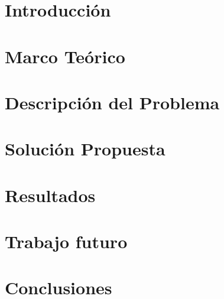 \documentclass[letterpaper,12pt]{book}
\begin{document}
\tableofcontents
\clearpage



\chapter{Introducción}
\label{chap:intro}

\clearpage

\chapter{Marco Teórico}
\label{chap:mteorico}

\clearpage

\chapter{Descripción del Problema}
\label{chap:problem}

\clearpage

\chapter{Solución Propuesta}
\label{chap:solution}

\clearpage

\chapter{Resultados}
\label{chap:results}

\clearpage

\chapter{Trabajo futuro}
\label{chap:futurework}

\clearpage

\chapter{Conclusiones}
\label{chap:concl}

\newpage

% 
\nocite{*}
\printbibliography
\end{document}
